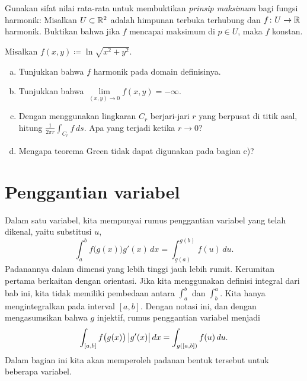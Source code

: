 \begin{exercise}
Gunakan sifat nilai rata-rata untuk membuktikan
\emph{prinsip maksimum}
bagi fungsi harmonik:
Misalkan $U \subset {\mathbb{R}}^2$ adalah himpunan terbuka terhubung dan
$f \colon U \to {\mathbb{R}}$ harmonik. Buktikan bahwa jika $f$ mencapai maksimum di
$p \in U$, maka $f$ konstan.
\end{exercise}

\begin{exercise}
Misalkan $f(x,y) \coloneqq \ln \sqrt{x^2+y^2}$.
\begin{enumerate}[a)]
\item
Tunjukkan bahwa $f$ harmonik pada domain definisinya.
\item
Tunjukkan bahwa $\lim\limits_{(x,y) \to 0} f(x,y) = -\infty$.
\item
Dengan menggunakan lingkaran $C_r$ berjari-jari
$r$ yang berpusat di titik asal, hitung $\frac{1}{2\pi r} \int_{C_r} f \, ds$.
Apa yang terjadi ketika $r \to 0$?
\item
Mengapa teorema Green tidak dapat digunakan pada bagian c)?
\end{enumerate}
\end{exercise}



\sectionnewpage
\section{Penggantian variabel}
\label{sec:mvchangeofvars}


Dalam satu variabel, kita mempunyai rumus penggantian variabel yang telah
dikenal, yaitu substitusi $u$,
\begin{equation*}
\int_a^b f\bigl(g(x)\bigr) g'(x)\, dx = 
\int_{g(a)}^{g(b)} f(u) \, du .
\end{equation*}
Padanannya dalam dimensi yang lebih tinggi jauh lebih rumit.  Kerumitan pertama
berkaitan dengan orientasi.  Jika kita menggunakan definisi integral dari bab
ini, kita tidak memiliki pembedaan antara $\int_a^b$ dan $\int_b^a$.  Kita hanya
mengintegralkan pada interval $[a,b]$.  Dengan notasi ini, dan dengan
mengasumsikan bahwa $g$ injektif, rumus penggantian variabel menjadi
\begin{equation*}
\int_{[a,b]} f\bigl(g(x)\bigr) \, \bigl\lvert {g'(x)} \bigr\rvert\, dx = 
\int_{g([a,b])} f(u) \, du .
\end{equation*}
Dalam bagian ini kita akan memperoleh padanan bentuk tersebut untuk beberapa
variabel.

